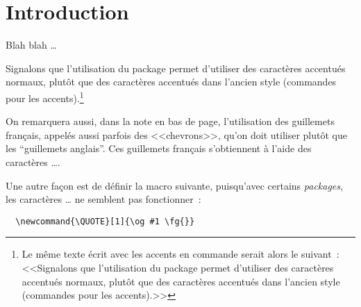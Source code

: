 
\chapter{Introduction}

\label{introduction.chap}



Blah blah \ldots


Signalons que l'utilisation du package  permet d'utiliser
des caractères accentués normaux, plutôt que des caractères accentués
dans l'ancien style (commandes pour les accents).\footnote{Le même
texte écrit avec les accents en commande serait alors le suivant~:
<<Signalons que l'utilisation du package  permet
d'utiliser des caract\`eres accentu\'es normaux, plut\^ot que des
caract\`eres accentu\'es dans l'ancien style (commandes pour les
accents).>>}

On remarquera aussi, dans la note en bas de page, l'utilisation des
guillemets français, appelés aussi parfois des <<chevrons>>, qu'on
doit utiliser plutôt que les ``guillemets anglais''.  Ces guillemets
français s'obtiennent à l'aide des caractères
\TT{<}\TT{<}\ldots\TT{>}\TT{>}.

Une autre façon est de définir la macro suivante, puisqu'avec certains
\emph{packages}, les caract\`eres \TT{<}\TT{<}\ldots\TT{>}\TT{>} ne
semblent pas fonctionner~:
{\small
\begin{verbatim}
  \newcommand{\QUOTE}[1]{\og #1 \fg{}}
\end{verbatim}
} 

